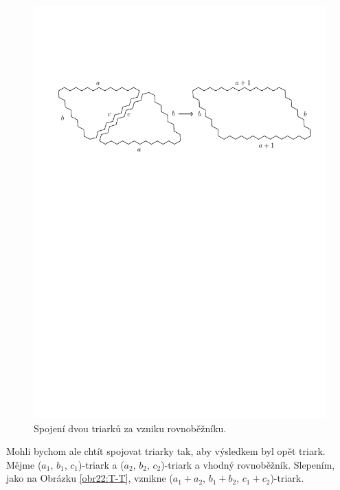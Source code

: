 \begin{figure}[h!]\centering
\includegraphics[width=\textwidth]{../img/T-P}
\caption{Spojení dvou triarků za vzniku rovnoběžníku.}
\label{obr21:T-P}
\end{figure}

Mohli bychom ale chtít spojovat triarky tak, aby výsledkem byl opět triark. Mějme ($a_1$, $b_1$, $c_1$)-triark a ($a_2$, $b_2$, $c_2$)-triark a vhodný rovnoběžník. Slepením, jako na Obrázku \ref{obr22:T-T}, vznikne ($a_1+a_2$, $b_1+b_2$, $c_1+c_2$)-triark. 


